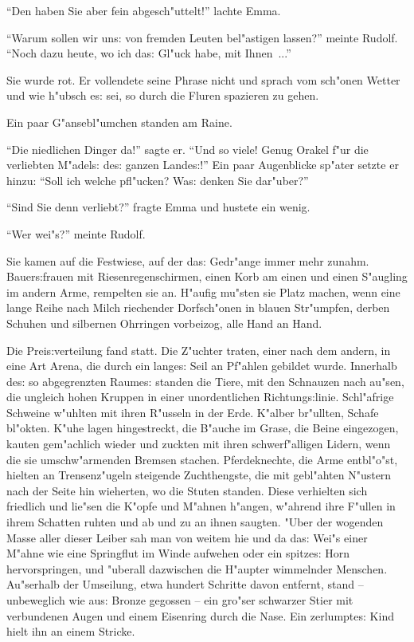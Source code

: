 \documentclass[oneside,12pt]{book}
\newcommand{\s}{s:}%
\begin{document}
"`Den haben Sie aber fein abgesch"uttelt!"' lachte Emma.

"`Warum sollen wir un{\s} von fremden Leuten bel"astigen lassen?"'
meinte Rudolf. "`Noch dazu heute, wo ich da{\s} Gl"uck habe, mit
Ihnen~..."'

Sie wurde rot. Er vollendete seine Phrase nicht und sprach vom
sch"onen Wetter und wie h"ubsch e{\s} sei, so durch die Fluren
spazieren zu gehen.

Ein paar G"ansebl"umchen standen am Raine.

"`Die niedlichen Dinger da!"' sagte er. "`Und so viele! Genug
Orakel f"ur die verliebten M"adel{\s} de{\s} ganzen Lande{\s}!"'
Ein paar Augenblicke sp"ater setzte er hinzu: "`Soll ich welche
pfl"ucken? Wa{\s} denken Sie dar"uber?"'

"`Sind Sie denn verliebt?"' fragte Emma und hustete ein wenig.

"`Wer wei"s?"' meinte Rudolf.

Sie kamen auf die Festwiese, auf der da{\s} Gedr"ange immer mehr
zunahm. Bauer{\s}frauen mit Riesenregenschirmen, einen Korb am
einen und einen S"augling im andern Arme, rempelten sie an.
H"aufig mu"sten sie Platz machen, wenn eine lange Reihe nach Milch
riechender Dorfsch"onen in blauen Str"umpfen, derben Schuhen und
silbernen Ohrringen vorbeizog, alle Hand an Hand.

Die Prei{\s}verteilung fand statt. Die Z"uchter traten, einer nach
dem andern, in eine Art Arena, die durch ein lange{\s} Seil an
Pf"ahlen gebildet wurde. Innerhalb de{\s} so abgegrenzten
Raume{\s} standen die Tiere, mit den Schnauzen nach au"sen, die
ungleich hohen Kruppen in einer unordentlichen Richtung{\s}linie.
Schl"afrige Schweine w"uhlten mit ihren R"usseln in der Erde.
K"alber br"ullten, Schafe bl"okten. K"uhe lagen hingestreckt, die
B"auche im Grase, die Beine eingezogen, kauten gem"achlich wieder
und zuckten mit ihren schwerf"alligen Lidern, wenn die sie
umschw"armenden Bremsen stachen. Pferdeknechte, die Arme
entbl"o"st, hielten an Trensenz"ugeln steigende Zuchthengste, die
mit gebl"ahten N"ustern nach der Seite hin wieherten, wo die
Stuten standen. Diese verhielten sich friedlich und lie"sen die
K"opfe und M"ahnen h"angen, w"ahrend ihre F"ullen in ihrem
Schatten ruhten und ab und zu an ihnen saugten. "Uber der wogenden
Masse aller dieser Leiber sah man von weitem hie und da da{\s}
Wei"s einer M"ahne wie eine Springflut im Winde aufwehen oder ein
spitze{\s} Horn hervorspringen, und "uberall dazwischen die
H"aupter wimmelnder Menschen. Au"serhalb der Umseilung, etwa
hundert Schritte davon entfernt, stand -- unbeweglich wie au{\s}
Bronze gegossen -- ein gro"ser schwarzer Stier mit verbundenen
Augen und einem Eisenring durch die Nase. Ein zerlumpte{\s} Kind
hielt ihn an einem Stricke.
\end{document}
